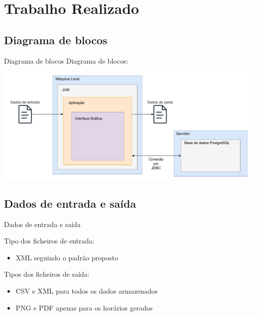 \documentclass[aspectratio=169]{beamer}
\begin{document}
    \section{Trabalho Realizado}

    \subsection{Diagrama de blocos}

    \begin{frame}{Diagrama de blocos}
        Diagrama de blocos:
        \begin{center}
            \includegraphics[width=\linewidth]{img/diagrama-blocos-slides.pdf}
        \end{center}
    \end{frame}

    \subsection{Dados de entrada e saída}

    \begin{frame}{Dados de entrada e saída}
        \justifying

        Tipo dos ficheiros de entrada:
        \begin{itemize}
            \item XML seguindo o padrão proposto
        \end{itemize}

        \vfill

        Tipos dos ficheiros de saída:
        \begin{itemize}
            \item CSV e XML para todos os dados armazenados
            \item PNG e PDF apenas para os horários gerados
        \end{itemize}

        \vfill
    \end{frame}
\end{document}
